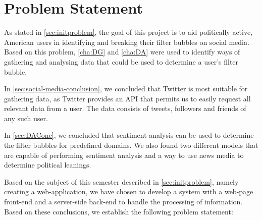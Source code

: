 \chapter{Problem Statement}\label{ch:problem}

As stated in \autoref{sec:initproblem}, the goal of this project is
to aid politically active, American users in identifying and breaking their
filter bubbles on social media. Based on this problem, \autoref{cha:DG} and
\autoref{cha:DA} were used to identify ways of gathering and analysing data
that could be used to determine a user's filter bubble.\nl

In \autoref{sec:social-media-conclusion}, we concluded that Twitter is most
suitable for gathering data, as Twitter provides an \ac{API} that permits us
to easily request all relevant data from a user. The data consists of tweets,
followers and friends of any such user.\nl

In \autoref{sec:DAConc}, we concluded that sentiment analysis can be used to
determine the filter bubbles for predefined domains. We also found two different
models that are capable of performing sentiment analysis and a way to use news
media to determine political leanings.\nl

Based on the subject of this semester described in \autoref{sec:initproblem},
namely creating a web-application, we have chosen to develop a system with a
web-page front-end and a server-side back-end to handle the processing of
information. Based on these conclusions, we establish the following problem
statement:\nl

\begin{center}
\begin{minipage}{0.95\linewidth}
\end{minipage}
\end{center}
\newpage


